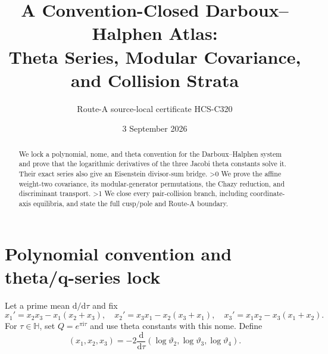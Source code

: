 \documentclass[10pt]{article}
\title{A Convention-Closed Darboux--Halphen Atlas:\\Theta Series, Modular Covariance, and Collision Strata}
\author{Route-A source-local certificate HCS-C320}
\date{3 September 2026}
\providecommand{\CRevisionRound}{2}
\newcommand{\HH}{\mathbb H}
\newcommand{\ii}{\mathrm i}
\newcommand{\dd}{\mathrm d}
\begin{document}
\maketitle
\begin{abstract}
We lock a polynomial, nome, and theta convention for the Darboux--Halphen
system and prove that the logarithmic derivatives of the three Jacobi theta
constants solve it.  Their exact series also give an Eisenstein divisor-sum
bridge.
\ifnum\CRevisionRound>0
We prove the affine weight-two covariance, its modular-generator
permutations, the Chazy reduction, and discriminant transport.
\fi
\ifnum\CRevisionRound>1
We close every pair-collision branch, including coordinate-axis equilibria,
and state the full cusp/pole and Route-A boundary.
\fi
\end{abstract}

\section{Polynomial convention and theta/q-series lock}
Let a prime mean $\dd/\dd\tau$ and fix
\begin{equation}\label{eq:DH}
 x_1'=x_2x_3-x_1(x_2+x_3),\quad
 x_2'=x_3x_1-x_2(x_3+x_1),\quad
 x_3'=x_1x_2-x_3(x_1+x_2).
\end{equation}
For $\tau\in\HH$, set $Q=e^{\pi\ii\tau}$ and use theta constants with this
nome.  Define
\begin{equation}\label{eq:seed}
 (x_1,x_2,x_3)=-2\frac{\dd}{\dd\tau}
 (\log\vartheta_2,\log\vartheta_3,\log\vartheta_4).
\end{equation}
\end{document}
